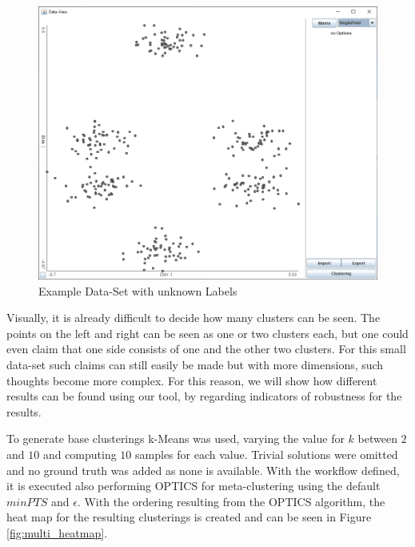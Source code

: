 \documentclass[
	a4paper,
	english,
	twoside,
	openright,               
	11pt                            
	]{report}
\begin{document}
\begin{figure}[h]
	\centering
	\includegraphics[scale=.5]{multi}
	\caption{Example Data-Set with unknown Labels}
	\label{fig:multi}
\end{figure}

Visually, it is already difficult to decide how many clusters can be seen. The points on the left and right can be seen as one or two clusters each, but one could even claim that one side consists of one and the other two clusters. For this small data-set such claims can still easily be made but with more dimensions, such thoughts become more complex. For this reason, we will show how different results can be found using our tool, by regarding indicators of robustness for the results.

To generate base clusterings k-Means was used, varying the value for $k$ between $2$ and $10$ and computing $10$ samples for each value. Trivial solutions were omitted and no ground truth was added as none is available. With the workflow defined, it is executed also performing OPTICS for meta-clustering using the default $minPTS$ and $\epsilon$. With the ordering resulting from the OPTICS algorithm, the heat map for the resulting clusterings is created and can be seen in Figure \ref{fig:multi_heatmap}.
\end{document}
